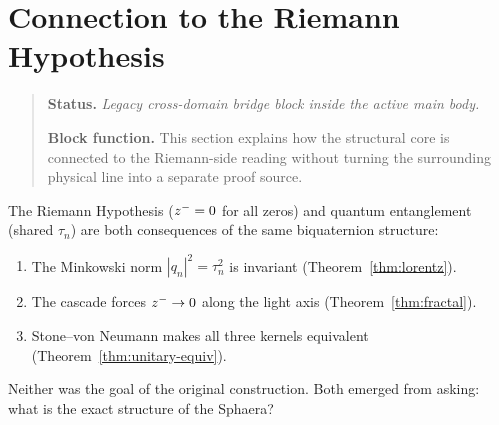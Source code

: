 \section{Connection to the Riemann Hypothesis}
\begin{quote}\small
\noindent\textbf{Status.} \emph{Legacy cross-domain bridge block inside the active main body.}\par
\noindent\textbf{Block function.} This section explains how the structural core is connected to the Riemann-side reading without turning the surrounding physical line into a separate proof source.
\end{quote}
\label{sec:rh}

\begin{remark}
The Riemann Hypothesis ($z^-=0$ for all zeros) and quantum
entanglement (shared $\tau_n$) are both consequences of the same
biquaternion structure:
\begin{enumerate}
  \item The Minkowski norm $|q_n|^2=\tau_n^2$ is invariant
        (Theorem~\ref{thm:lorentz}).
  \item The cascade forces $z^-\to 0$ along the light axis
        (Theorem~\ref{thm:fractal}).
  \item Stone--von Neumann makes all three kernels equivalent
        (Theorem~\ref{thm:unitary-equiv}).
\end{enumerate}
Neither was the goal of the original construction.
Both emerged from asking: what is the exact structure of the Sphaera?
\end{remark}


